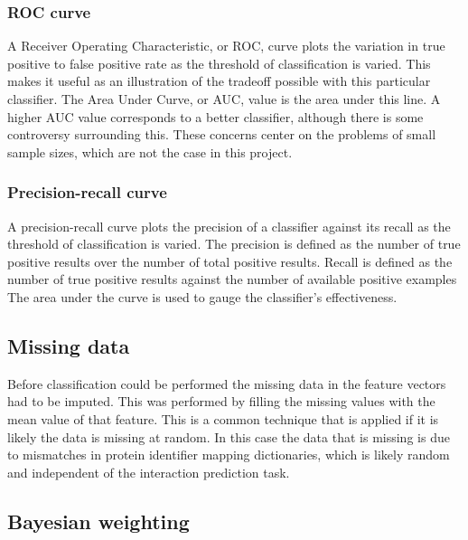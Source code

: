 \subsubsection*{\ac{ROC} curve}
A Receiver Operating Characteristic, or \ac{ROC}, curve plots the variation in true positive to false positive rate as the threshold of classification is varied.
This makes it useful as an illustration of the tradeoff possible with this particular classifier.
The Area Under Curve, or \ac{AUC}, value is the area under this line.
A higher \ac{AUC} value corresponds to a better classifier, although there is some controversy surrounding this\autocite{hanczar_small-sample_2010}.
These concerns center on the problems of small sample sizes, which are not the case in this project.
\subsubsection*{Precision-recall curve}
A precision-recall curve plots the precision of a classifier against its recall as the threshold of classification is varied.
The precision is defined as the number of true positive results over the number of total positive results.
Recall is defined as the number of true positive results against the number of available positive examples
The area under the curve is used to gauge the classifier's effectiveness.

\subsection{Missing data}
Before classification could be performed the missing data in the feature vectors had to be imputed.
This was performed by filling the missing values with the mean value of that feature.
This is a common technique that is applied if it is likely the data is missing at random.
In this case the data that is missing is due to mismatches in protein identifier mapping dictionaries, which is likely random and independent of the interaction prediction task.

\subsection{Bayesian weighting}
\label{bayes}

